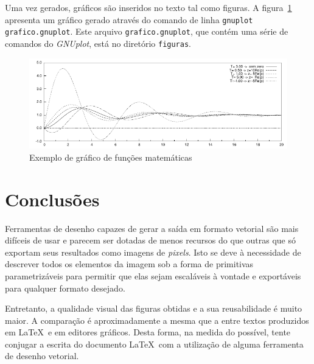 Uma vez gerados, gráficos são inseridos no texto tal como figuras. A
figura~\ref{fig:grafico} apresenta um gráfico gerado através do
comando de linha \texttt{gnuplot grafico.gnuplot}. Este arquivo
\texttt{grafico.gnuplot}, que contém uma série de comandos do
\textit{GNUplot}, está no diretório \texttt{figuras}.

\begin{figure}[htbp]
\centering
\includegraphics{./figuras/grafico}
\caption{Exemplo de gráfico de funções matemáticas}
\label{fig:grafico}
\end{figure}

\section{Conclusões}

Ferramentas de desenho capazes de gerar a saída em formato vetorial
são mais difíceis de usar e parecem ser dotadas de menos recursos do
que outras que só exportam seus resultados como imagens de
\emph{pixels}.  Isto se deve à necessidade de descrever todos os
elementos da imagem sob a forma de primitivas parametrizáveis para
permitir que elas sejam escaláveis à vontade e exportáveis para
qualquer formato desejado.

Entretanto, a qualidade visual das figuras obtidas e a sua
reusabilidade é muito maior. A comparação é aproximadamente a mesma
que a entre textos produzidos em \LaTeX\ e em editores gráficos. Desta
forma, na medida do possível, tente conjugar a escrita do documento
\LaTeX\ com a utilização de alguma ferramenta de desenho vetorial.

